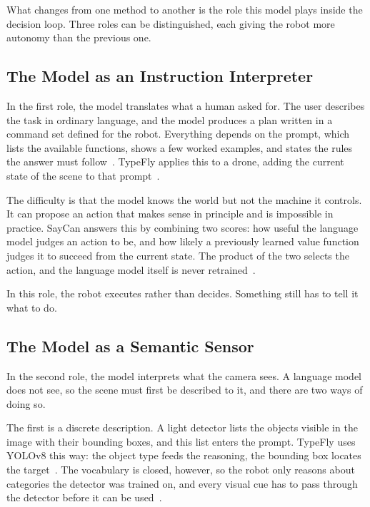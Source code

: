 What changes from one method to another is the role this model plays inside the
decision loop. Three roles can be distinguished, each giving the robot more
autonomy than the previous one.

\subsection{The Model as an Instruction Interpreter}%
\label{subsec:nav:genai-interface}

In the first role, the model translates what a human asked for. The user
describes the task in ordinary language, and the model produces a plan written in
a command set defined for the robot. Everything depends on the prompt, which
lists the available functions, shows a few worked examples, and states the rules
the answer must follow~\cite{vemprala2023chatgpt}. TypeFly applies this to a
drone, adding the current state of the scene to that
prompt~\cite{chen2024typefly}.

The difficulty is that the model knows the world but not the machine it controls.
It can propose an action that makes sense in principle and is impossible in
practice. SayCan answers this by combining two scores: how useful the language
model judges an action to be, and how likely a previously learned value function
judges it to succeed from the current state. The product of the two selects the
action, and the language model itself is never
retrained~\cite{ahn2022saycan}.

In this role, the robot executes rather than decides. Something still has to tell
it what to do.

\subsection{The Model as a Semantic Sensor}%
\label{subsec:nav:genai-vlm}

In the second role, the model interprets what the camera sees. A language model
does not see, so the scene must first be described to it, and there are two ways
of doing so.

The first is a discrete description. A light detector lists the objects visible
in the image with their bounding boxes, and this list enters the prompt. TypeFly
uses YOLOv8 this way: the object type feeds the reasoning, the bounding box
locates the target~\cite{chen2024typefly}. The vocabulary is closed, however, so
the robot only reasons about categories the detector was trained on, and every
visual cue has to pass through the detector before it can be
used~\cite{yokoyama2024vlfm}.

